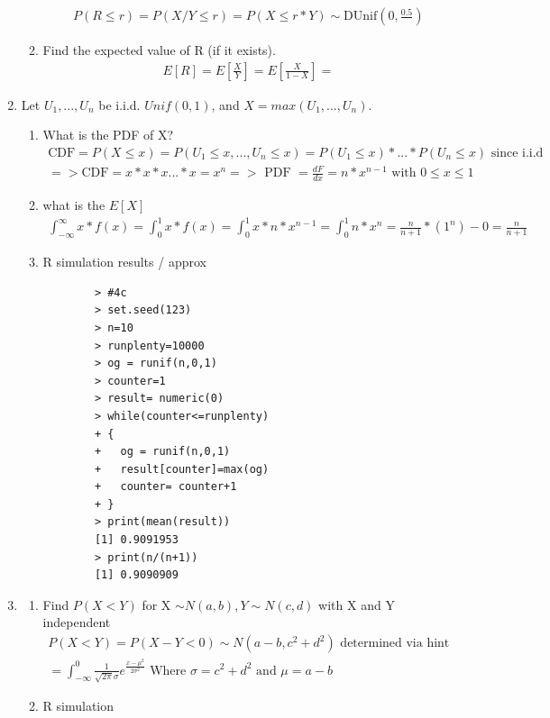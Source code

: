\documentclass[11pt]{article}
\begin{document}
\begin{enumerate}
\begin{enumerate}
	\begin{gather}
		P(R \le r) = P(X/Y \le r) = P(X \le r*Y) \sim \text{DUnif}(0,\frac{0.5}{})
	\end{gather}
	\item Find the expected value of R (if it exists).
	\begin{gather}
		E[R] = E[\frac{X}{Y}] = E[\frac{X}{1-X}] = 
	\end{gather}
\end{enumerate}
\item Let $U_1,...,U_n$ be i.i.d. $Unif(0,1)$, and $X = max(U_1,...,U_n)$.
\begin{enumerate}
	\item What is the PDF of X?
	\begin{gather}
		\text{CDF} = P(X \le x) = P(U_1 \le x , ... , U_n \le x) = P(U_1 \le x) *  ... * P(U_n \le x) \text{ since i.i.d}\\
		=> \text{CDF} = x*x*x...*x = x^n => \text{ PDF } = \frac{dF}{dx} = n*x^{n-1} \text{ with } 0 \le x \le 1
	\end{gather}
	\item what is the $E[X]$
	\begin{gather}
		\int_{-\infty}^{\infty}x*f(x) = \int_{0}^{1}x*f(x) = \int_{0}^{1}x*n*x^{n-1} = \int_{0}^{1}n*x^{n} =\frac{n}{n+1}*(1^n) - 0 = \frac{n}{n+1}
	\end{gather}
	\item R simulation results / approx
	\begin{verbatim}
		> #4c
		> set.seed(123)
		> n=10
		> runplenty=10000
		> og = runif(n,0,1)
		> counter=1
		> result= numeric(0)
		> while(counter<=runplenty)
		+ {
		+   og = runif(n,0,1)
		+   result[counter]=max(og)
		+   counter= counter+1
		+ }
		> print(mean(result))
		[1] 0.9091953
		> print(n/(n+1))
		[1] 0.9090909
	\end{verbatim}
\end{enumerate}
\item 
\begin{enumerate}
	\item Find $P(X < Y)$ for X $\sim N(a, b), Y \sim N(c, d)$ with X and Y independent
	\begin{gather}
		P(X<Y) = P(X-Y < 0) \sim N(a-b,c^2 + d^2) \text{ determined via hint}\\
		= \int_{-\infty}^{0} \frac{1}{\sqrt{2\pi} \sigma} e ^ {\frac{{x-\mu}^2}{2\sigma ^2}} \text{ Where } \sigma = c^2 + d^2 \text{ and } \mu = a-b
	\end{gather}
	\item R simulation

\end{enumerate}
\end{enumerate}
\end{document}
